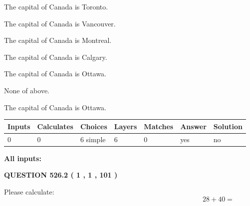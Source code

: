 \documentclass[12pt]{article}
\begin{document}
 
The capital of Canada is Toronto.
 
 
The capital of Canada is Vancouver.
 
 
The capital of Canada is Montreal.
 
 
The capital of Canada is Calgary.
 
 
The capital of Canada is Ottawa.
 
 
 None of above.
 
 
\noindent{}
 
 
The capital of Canada is Ottawa.
 
 
\noindent{}
 
 
   
   
   
   
\noindent\begin{tabular}{|l|l|l|l|l|l|l|}
 \hline
Inputs & Calculates & Choices & Layers & Matches & Answer & Solution \\ \hline
 0  & 
 0  & 
 6
  simple  
  & 
 6  & 
 0  & 
  yes & 
  no 
  \\ \hline
 \end{tabular}
   
   
   
   
\noindent{}
   
   
   
   
\noindent\vspace{0.1in}\hspace{-0.08in} {\textbf{\Large{All inputs: }}}
   
   
  
\vspace{0.2in}
  
{\textbf{\Large{QUESTION
526.2 
 ( 1 , 1 , 101 )
}}}
  
  
 
Please calculate:
\begin{equation}
28 +  %
40 = \nonumber
\end{equation}
 
 
 
\noindent{}
 
\end{document}
